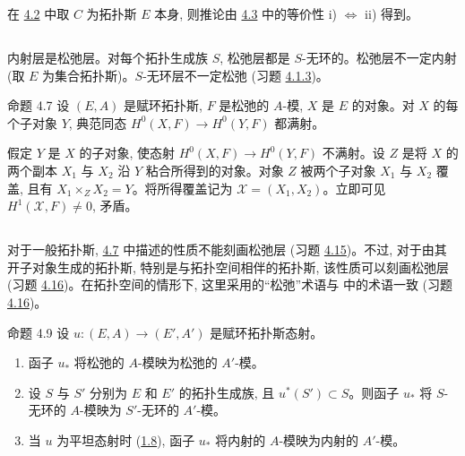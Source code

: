 在 \hyperref[V.subsec4.2]{4.2} 中取 $C$ 为拓扑斯 $E$ 本身, 则推论由 \hyperref[V.prop4.3]{4.3} 中的等价性 i) $\Leftrightarrow$ ii) 得到。

\setcounter{subsection}{5}
\subsection{}
内射层是松弛层。对每个拓扑生成族 $S$, 松弛层都是 $S$-无环的。松弛层不一定内射 (取 $E$ 为集合拓扑斯)。$S$-无环层不一定松弛 (习题 \hyperref[V.exer4.13]{4.1.3})。

\begin{enonce*}{命题 4.7}
设 $(E,A)$ 是赋环拓扑斯, $F$ 是松弛的 $A$-模, $X$ 是 $E$ 的对象。对 $X$ 的每个子对象 $Y$, 典范同态 $H^{0}(X,F)\rightarrow H^{0}(Y,F)$ 都\pageoriginale 满射。
\end{enonce*}

假定 $Y$ 是 $X$ 的子对象, 使态射 $H^{0}(X,F)\to H^{0}(Y,F)$ 不满射。设 $Z$ 是将 $X$ 的两个副本 $X_1$ 与 $X_2$ 沿 $Y$ 粘合所得到的对象。对象 $Z$ 被两个子对象 $X_1$ 与 $X_2$ 覆盖, 且有 $X_1\times_ZX_2=Y$。将所得覆盖记为 $𝒳=(X_1,X_2)$。立即可见 $H^1(𝒳,F)\neq0$, 矛盾。

\setcounter{subsection}{7}
\subsection{}
对于一般拓扑斯, \hyperref[V.prop4.7]{4.7} 中描述的性质不能刻画松弛层 (习题 \hyperref[V.exer4.15]{4.15})。不过, 对于由其开子对象生成的拓扑斯, 特别是与拓扑空间相伴的拓扑斯, 该性质可以刻画松弛层 (习题 \hyperref[V.exer4.16]{4.16})。在拓扑空间的情形下, 这里采用的“松弛”术语与 \cite{sga4.exp.V.bib.7} 中的术语一致 (习题 \hyperref[V.exer4.16]{4.16})。

\begin{enonce*}{命题 4.9}
设 $u:(E,A)\to(E',A')$ 是赋环拓扑斯态射。
\begin{enumerate}
\renewcommand{\labelenumi}{\theenumi)}
\item 函子 $u_\ast$ 将松弛的 $A$-模映为松弛的 $A'$-模。

\item 设 $S$ 与 $S'$ 分别为 $E$ 和 $E'$ 的拓扑生成族, 且 $u^\ast(S')\subset S$。则函子 $u_\ast$ 将 $S$-无环的 $A$-模映为 $S'$-无环的 $A'$-模。

\item 当 $u$ 为平坦态射时 (\hyperref[V.def1.8]{1.8}), 函子 $u_\ast$ 将内射的 $A$-模映为内射的 $A'$-模。
\end{enumerate}
\end{enonce*}


